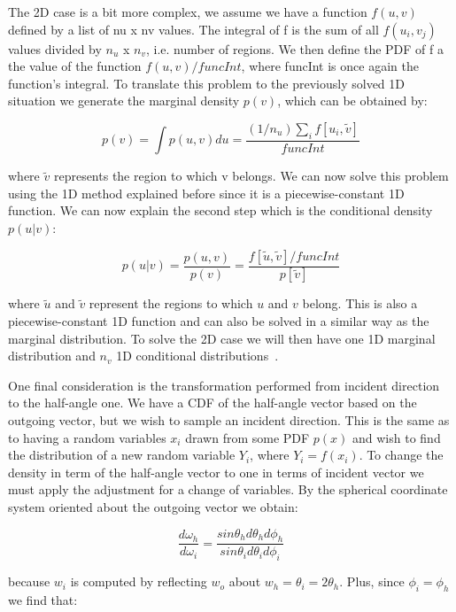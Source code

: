 \documentclass[conference]{acmsiggraph}
\begin{document}
The 2D case is a bit more complex, we assume we have a function $f(u, v)$ defined by a list of nu x nv values. The integral of f is the sum of all $f(u_{i}, v_{j})$ values divided by $n_{u}$ x $n_{v}$, i.e. number of regions. We then define the PDF of f a the value of the function $f(u, v)/funcInt$, where funcInt is once again the function's integral. To translate this problem to the previously solved 1D situation we generate the marginal density $p(v)$, which can be obtained by:

\begin{equation}
p(v) = \int p(u,v)du = \frac{(1/n_{u})\sum_{i}f[u_{i},\tilde{v}]}{funcInt}
\end{equation}

where $\tilde{v}$ represents the region to which v belongs. We can now solve this problem using the 1D method explained before since it is a piecewise-constant 1D function. We can now explain the second step which is the conditional density $p(u|v)$:

\begin{equation}
p(u|v) = \frac{p(u,v)}{p(v)} = \frac{f[\tilde{u}, \tilde{v}]/funcInt}{p[\tilde{v}]}
\end{equation}

where $\tilde{u}$ and $\tilde{v}$ represent the regions to which $u$ and $v$ belong. This is also a piecewise-constant 1D function and can also be solved in a similar way as the marginal distribution. To solve the 2D case we will then have one 1D marginal distribution and $n_{v}$ 1D conditional distributions~\cite{Pharr:2010:PBR}. 

One final consideration is the transformation performed from incident direction to the half-angle one. We have a CDF of the half-angle vector based on the outgoing vector, but we wish to sample an incident direction. This is the same as to having a random variables $x_{i}$ drawn from some PDF $p(x)$ and wish to find the distribution of a new random variable $Y_{i}$, where $Y_{i} = f(x_{i})$. To change the density in term of the half-angle vector to one in terms of incident vector we must apply the adjustment for a change of variables. By the spherical coordinate system oriented about the outgoing vector we obtain:

\begin{equation}
\frac{d\omega_{h}}{d\omega_{i}} = \frac{sin\theta_{h}d\theta_{h}d\phi_{h}}{sin\theta_{i}d\theta_{i}d\phi_{i}}
\end{equation}

because $w_{i}$ is computed by reflecting $w_{o}$ about $w_{h} = \theta_{i} = 2\theta_{h}$. Plus, since $\phi_{i} = \phi_{h}$ we find that:
\end{document}
